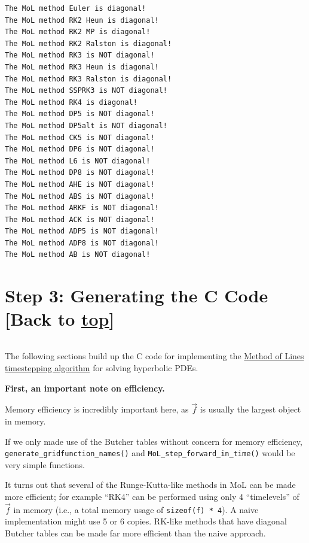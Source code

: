 \documentclass[landscape,letterpaper,10pt,english]{article}
\begin{document}
    \begin{Verbatim}[commandchars=\\\{\}]
The MoL method Euler is diagonal!
The MoL method RK2 Heun is diagonal!
The MoL method RK2 MP is diagonal!
The MoL method RK2 Ralston is diagonal!
The MoL method RK3 is NOT diagonal!
The MoL method RK3 Heun is diagonal!
The MoL method RK3 Ralston is diagonal!
The MoL method SSPRK3 is NOT diagonal!
The MoL method RK4 is diagonal!
The MoL method DP5 is NOT diagonal!
The MoL method DP5alt is NOT diagonal!
The MoL method CK5 is NOT diagonal!
The MoL method DP6 is NOT diagonal!
The MoL method L6 is NOT diagonal!
The MoL method DP8 is NOT diagonal!
The MoL method AHE is NOT diagonal!
The MoL method ABS is NOT diagonal!
The MoL method ARKF is NOT diagonal!
The MoL method ACK is NOT diagonal!
The MoL method ADP5 is NOT diagonal!
The MoL method ADP8 is NOT diagonal!
The MoL method AB is NOT diagonal!
    \end{Verbatim}

    \hypertarget{step-3-generating-the-c-code-back-to-top}{%
\section{\texorpdfstring{Step 3: Generating the C Code {[}Back to
\hyperref[toc]{top}{]}}{Step 3: Generating the C Code {[}Back to {]}}}\label{step-3-generating-the-c-code-back-to-top}}

\[\label{ccode}\]

The following sections build up the C code for implementing the
\href{http://www.scholarpedia.org/article/Method_of_lines}{Method of
Lines timestepping algorithm} for solving hyperbolic PDEs.

\textbf{First, an important note on efficiency.}

Memory efficiency is incredibly important here, as \(\vec{f}\) is
usually the largest object in memory.

If we only made use of the Butcher tables without concern for memory
efficiency, \texttt{generate\_gridfunction\_names()} and
\texttt{MoL\_step\_forward\_in\_time()} would be very simple functions.

It turns out that several of the Runge-Kutta-like methods in MoL can be
made more efficient; for example ``RK4'' can be performed using only 4
``timelevels'' of \(\vec{f}\) in memory (i.e., a total memory usage of
\texttt{sizeof(f)\ *\ 4}). A naive implementation might use 5 or 6
copies. RK-like methods that have diagonal Butcher tables can be made
far more efficient than the naive approach.
\end{document}
